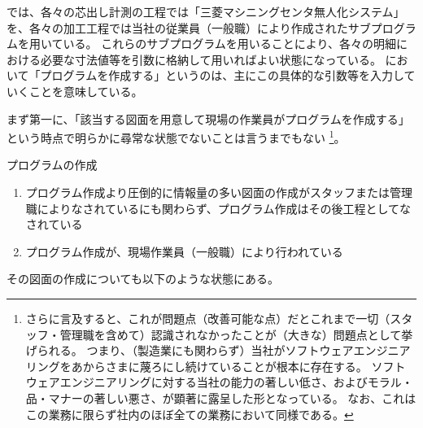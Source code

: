

\MMname では、各々の芯出し計測の工程では「三菱マシニングセンタ無人化システム」を、各々の加工工程では当社の従業員（一般職）により作成されたサブプログラムを用いている。
これらのサブプログラムを用いることにより、各々の明細における必要な寸法値等を引数に格納して用いればよい状態になっている。
\MMname において「プログラムを作成する」というのは、主にこの具体的な引数等を入力していくことを意味している。



まず第一に、「該当する図面を用意して現場の作業員がプログラムを作成する」という時点で明らかに尋常な状態でないことは言うまでもない
\footnote{さらに言及すると、これが問題点（改善可能な点）だとこれまで一切（スタッフ・管理職を含めて）認識されなかったことが（大きな）問題点として挙げられる。
つまり、（製造業にも関わらず）当社がソフトウェアエンジニアリングをあからさまに蔑ろにし続けていることが根本に存在する。
ソフトウェアエンジニアリングに対する当社の能力の著しい低さ、およびモラル・品・マナーの著しい悪さ、が顕著に露呈した形となっている。
なお、これはこの業務に限らず社内のほぼ全ての業務において同様である。}。
\begin{Issues}{プログラムの作成}
\begin{enumerate}
\item プログラム作成より圧倒的に情報量の多い図面の作成がスタッフまたは管理職によりなされているにも関わらず、プログラム作成はその後工程としてなされている
\item プログラム作成が、現場作業員（一般職）により行われている
\end{enumerate}
\end{Issues}
その図面の作成についても以下のような状態にある。
